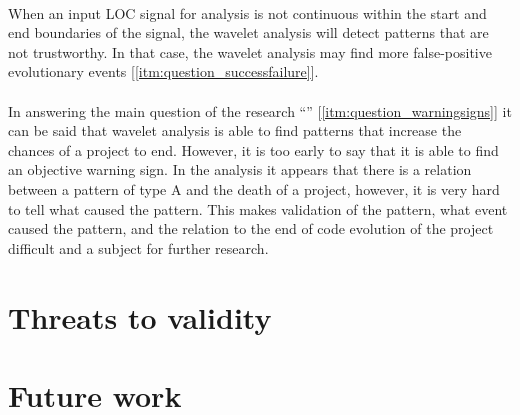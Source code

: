 \paragraph{}
When an input LOC signal for analysis is not continuous within the start
and end boundaries of the signal, the wavelet analysis will detect patterns
that are not trustworthy. In that case, the wavelet analysis may find
more false-positive evolutionary events [\ref{itm:question_successfailure}].

\paragraph{}
In answering the main question of the research
``\emph{\researchQuestion}\rm'' [\ref{itm:question_warningsigns}]
it can be said that wavelet analysis is able to find patterns that increase the
chances of a project to end. However, it is too early to say that it is able to
find an objective warning sign. In the analysis it appears that there is a
relation between a pattern of type A and the death of a project, however, it is
very hard to tell what caused the pattern.
This makes validation of the pattern, what event caused the pattern, and the
relation to the end of code evolution of the project difficult and a subject
for further research.


\section{Threats to validity}
\begin{comment}
* Is the Ohloh database a representation of the world of OSS projects?
* Is LOC as the sum of source lines of code, comments, and blank lines valid?
* The use of LOC as a measure of project evolution. Does it represent
activity/growth/whatever to say something about the project's status?
* A selection criterion for the projects was a continuous series of subsequent
monthly facts. Maybe the full series of evolution data of a project is needed in
order to find objective signs or to be able to compare different projects.
* Is 250 projects enough to detect patterns and generalise to the world of OSS
projects?
* Is monthly aggregated data fine-grained enough?

\end{comment}

\section{Future work}

